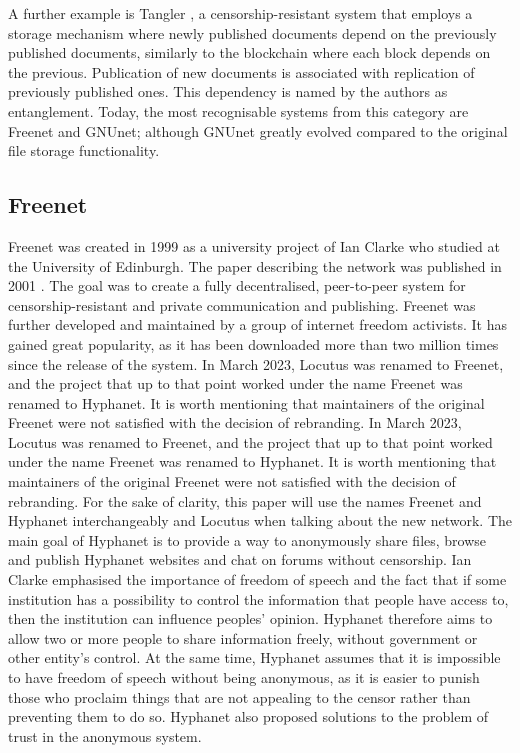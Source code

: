 A further example is Tangler \cite{tangler},  a censorship-resistant system that employs a storage mechanism where newly published documents depend on the previously published documents, similarly to the blockchain where each block depends on the previous. Publication of new documents is associated with replication of previously published ones. This dependency is named by the authors as entanglement.
Today, the most recognisable systems from this category are Freenet and GNUnet; although GNUnet greatly evolved compared to the original file storage functionality.

\subsection{Freenet}
Freenet was created in 1999 as a university project of Ian Clarke who studied at the University of Edinburgh. The paper describing the network was published in 2001 \cite{freenet}. The goal was to create a fully decentralised, peer-to-peer system for censorship-resistant and private communication and publishing. Freenet was further developed and maintained by a group of internet freedom activists. It has gained great popularity, as it has been downloaded more than two million times since the release of the system.
In March 2023, Locutus was renamed to Freenet, and the project that up to that point worked under the name Freenet was renamed to Hyphanet. It is worth mentioning that maintainers of the original Freenet were not satisfied with the decision of rebranding.
In March 2023, Locutus was renamed to Freenet, and the project that up to that point worked under the name Freenet was renamed to Hyphanet. It is worth mentioning that maintainers of the original Freenet were not satisfied with the decision of rebranding.
For the sake of clarity, this paper will use the names Freenet and Hyphanet interchangeably and Locutus when talking about the new network.
The main goal of Hyphanet is to provide a way to anonymously share files, browse and publish Hyphanet websites and chat on forums without censorship. Ian Clarke emphasised the importance of freedom of speech and the fact that if some institution has a possibility to control the information that people have access to, then the institution can influence peoples’ opinion. Hyphanet therefore aims to allow two or more people to share information freely, without government or other entity’s control.
At the same time, Hyphanet assumes that it is impossible to have freedom of speech without being anonymous, as it is easier to punish those who proclaim things that are not appealing to the censor rather than preventing them to do so. Hyphanet also proposed solutions to the problem of trust in the anonymous system.

